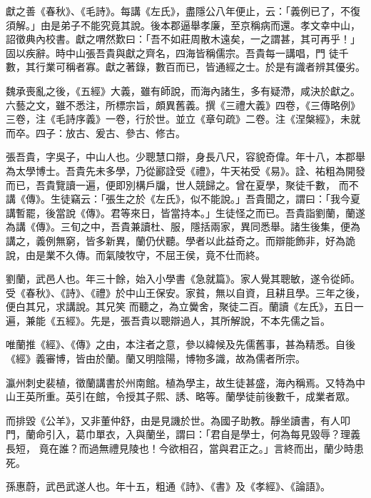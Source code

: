 \begin{pinyinscope}
 獻之善《春秋》、《毛詩》。每講《左氏》，盡隱公八年便止，云：「義例已了，不復須解。」由是弟子不能究竟其說。後本郡逼舉孝廉，至京稱病而還。孝文幸中山，詔徵典內校書。獻之喟然歎曰：「吾不如莊周散木遠矣，一之謂甚，其可再乎！」固以疾辭。時中山張吾貴與獻之齊名，四海皆稱儒宗。吾貴每一講唱，門
 徒千數，其行業可稱者寡。獻之著錄，數百而已，皆通經之士。於是有識者辨其優劣。



 魏承喪亂之後，《五經》大義，雖有師說，而海內諸生，多有疑滯，咸決於獻之。六藝之文，雖不悉注，所標宗旨，頗異舊義。撰《三禮大義》四卷，《三傳略例》三卷，注《毛詩序義》一卷，行於世。並立《章句疏》二卷。注《涅槃經》，未就而卒。四子：放古、爰古、參古、修古。



 張吾貴，字吳子，中山人也。少聰慧口辯，身長八尺，容貌奇偉。年十八，本郡舉為太學博士。吾貴先未多學，乃從酈詮受《禮》，牛天祐受《易》。詮、祐粗為開發而已，吾貴覽讀一遍，便即別構戶牖，世人競歸之。曾在夏學，聚徒千數，
 而不講《傳》。生徒竊云：「張生之於《左氏》，似不能說。」吾貴聞之，謂曰：「我今夏講暫罷，後當說《傳》。君等來日，皆當持本。」生徒怪之而已。吾貴詣劉蘭，蘭遂為講《傳》。三旬之中，吾貴兼讀杜、服，隱括兩家，異同悉舉。諸生後集，便為講之，義例無窮，皆多新異，蘭仍伏聽。學者以此益奇之。而辯能飾非，好為詭說，由是業不久傳。而氣陵牧守，不屈王侯，竟不仕而終。



 劉蘭，武邑人也。年三十餘，始入小學書《急就篇》。家人覺其聰敏，遂令從師。受《春秋》、《詩》、《禮》於中山王保安。家貧，無以自資，且耕且學。三年之後，便白其兄，求講說。其兄笑
 而聽之，為立黌舍，聚徒二百。蘭讀《左氏》，五日一遍，兼能《五經》。先是，張吾貴以聰辯過人，其所解說，不本先儒之旨。



 唯蘭推《經》、《傳》之由，本注者之意，參以緯候及先儒舊事，甚為精悉。自後《經》義審博，皆由於蘭。蘭又明陰陽，博物多識，故為儒者所宗。



 瀛州刺史裴植，徵蘭講書於州南館。植為學主，故生徒甚盛，海內稱焉。又特為中山王英所重。英引在館，令授其子熙、誘、略等。蘭學徒前後數千，成業者眾。



 而排毀《公羊》，又非董仲舒，由是見譏於世。為國子助教。靜坐讀書，有人叩門，蘭命引入，葛巾單衣，入與蘭坐，謂曰：「君自是學士，何為每見毀辱？理義長短，
 竟在誰？而過無禮見陵也！今欲相召，當與君正之。」言終而出，蘭少時患死。



 孫惠蔚，武邑武遂人也。年十五，粗通《詩》、《書》及《孝經》、《論語》。




\end{pinyinscope}
